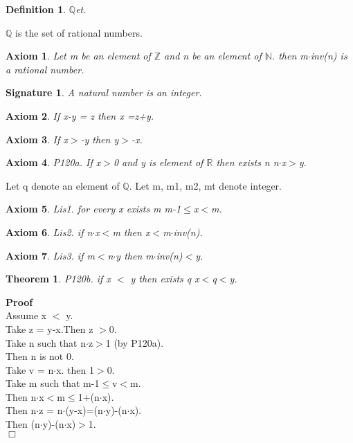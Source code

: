 \documentclass{article}
\newenvironment{forthel}{\begin{leftbar}}{\end{leftbar}}
\newenvironment{proof}{\noindent\textbf{Proof\ }}{\hspace*{\fill}$\Box$\medskip}
\newtheorem{axiom}{Axiom}
\newtheorem{theorem}{Theorem}
\newtheorem{definition}{Definition}
\newtheorem{signature}{Signature}
\begin{document}
\begin{forthel}
\begin{definition} $\mathbb{Q}$et.

\end{definition}
$\mathbb{Q}$ is the set of rational numbers.

\begin{axiom} Let m be an element of $\mathbb{Z}$ and n be an element of $\mathbb{N}$. then m$\cdot$inv(n) is a rational number.

\end{axiom}

\begin{signature} A natural number is an integer.

\end{signature}


\begin{axiom} If x-y = z then x =z+y. 

\end{axiom}
\begin{axiom} If x$>$-y then y$>$-x. 

\end{axiom}


\begin{axiom} P120a. If x$>$0 and y is element of $\mathbb{R}$ then exists n  n$\cdot$x$>$y.

\end{axiom}


Let q denote an element of $\mathbb{Q}$.
Let m, m1, m2, mt denote integer.


\begin{axiom} Lis1. for every x exists m m-1$\leq$x$<$m.

\end{axiom}
\begin{axiom} Lis2. if n$\cdot$x$<$m then x$<$m$\cdot$inv(n).

\end{axiom}
\begin{axiom} Lis3. if m$<$n$\cdot$y then m$\cdot$inv(n)$<$y.

\end{axiom}



\begin{theorem}
 P120b. if x $<$ y then exists q   x$<$q$<$y.
\end{theorem}\begin{proof}\\
Assume x $<$ y.\\
Take z = y-x.Then z $>$0.\\
Take n  such that n$\cdot$z$>$1 (by P120a).\\
Then n is not 0.\\
Take v = n$\cdot$x. then 1$>$0.\\
Take m such that m-1$\leq$v$<$m.\\
Then n$\cdot$x$<$m$\leq$1+(n$\cdot$x).\\
Then n$\cdot$z = n$\cdot$(y-x)=(n$\cdot$y)-(n$\cdot$x).\\
Then (n$\cdot$y)-(n$\cdot$x)$>$1.\\


\end{proof}
\end{forthel}
\end{document}
